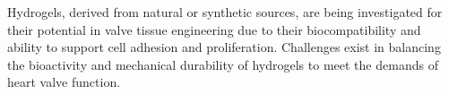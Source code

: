 Hydrogels, derived from natural or synthetic sources, are being investigated for their potential in valve tissue engineering due to their biocompatibility and ability to support cell adhesion and proliferation. Challenges exist in balancing the bioactivity and mechanical durability of hydrogels to meet the demands of heart valve function.




